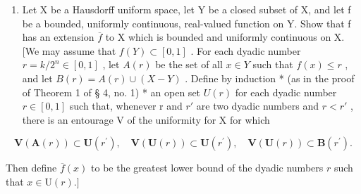 \begin{enumerate}
\def\labelenumi{\arabic{enumi})}
\setcounter{enumi}{21}
\tightlist
\item
  Let X be a Hausdorff uniform space, let Y be a closed subset of X, and let f be a bounded, uniformly continuous, real-valued function on Y. Show that f has an extension \(\overline{f}\) to X which is bounded and uniformly continuous on X. {[}We may assume that \(f(Y) \subset [0, 1]\) . For each dyadic number \(r = k/2^{n} \in [0, 1]\) , let \(A(r)\) be the set of all \(x \in Y\) such that \(f(x) \leqslant r\) , and let \(B(r) = A(r) \cup (X - Y)\) . Define by induction * (as in the proof of Theorem 1 of § 4, no. 1) * an open set \(U(r)\) for each dyadic number \(r \in [0, 1]\) such that, whenever r and \(r'\) are two dyadic numbers and \(r < r'\) , there is an entourage V of the uniformity for X for which
\end{enumerate}

\[
\mathbf {V} (\mathbf {A} (r)) \subset \mathbf {U} (r ^ {\prime}), \quad \mathbf {V} (\mathbf {U} (r)) \subset \mathbf {U} (r ^ {\prime}), \quad \mathbf {V} (\mathbf {U} (r)) \subset \mathbf {B} (r ^ {\prime}).
\]

Then define \(\overline{f}(x)\) to be the greatest lower bound of the dyadic numbers \(r\) such that \(x \in \mathrm{U}(r).]\)

